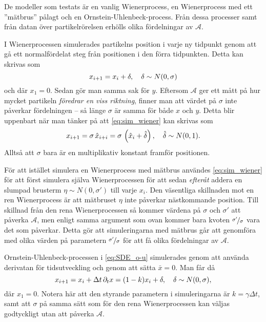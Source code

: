 
De modeller som testats är en vanlig Wienerprocess, en Wienerprocess med ett ''mätbrus'' pålagt och en Ornstein-Uhlenbeck-process. Från dessa processer samt från datan över partikelrörelsen erhölls olika fördelningar av $\mathcal{A}$. 


I Wienerprocessen simulerades partikelns position i varje ny tidpunkt genom att gå ett normalfördelat steg från positionen i den förra tidpunkten. Detta kan skrivas som
\begin{equation}\label{eq:sim_wiener}
x_{i+1} = x_i + \delta 
\qcomma  \delta \sim N(0, \sigma)
\end{equation}
och där $x_1=0$. Sedan gör man samma sak för $y$. Eftersom $\mathcal{A}$ ger ett mått på hur mycket partikeln \emph{föredrar en viss riktning}, finner man att värdet på $\sigma$ inte påverkar fördelningen -- så länge $\sigma$ är samma för både $x$ och $y$. Detta blir uppenbart när man tänker på att \eqref{eq:sim_wiener} kan skrivas som 
\begin{equation}
x_{i+1} =\sigma\,\hat{x}_{i+i} = \sigma\,\left( \hat{x}_i + \hat{\delta} \right) 
\qcomma  \hat{\delta} \sim N(0, 1).
\end{equation}
Alltså att $\sigma$ bara är en multiplikativ konstant framför positionen.

För att istället simulera en Wienerprocess med mätbrus användes \eqref{eq:sim_wiener} för att först simulera själva Wienerprocessen för att sedan \emph{efteråt} addera en slumpad brusterm $\eta \sim N(0, \sigma')$ till varje $x_i$. Den väsentliga skillnaden mot en ren Wienerprocess är att mätbruset $\eta$ inte påverkar nästkommande position. Till skillnad från den rena Wienerprocessen så kommer värdena på $\sigma$ och $\sigma'$ att påverka $\mathcal{A}$, men enligt samma argument som ovan kommer bara kvoten $\nicefrac{\sigma'}{\sigma}$ vara det som påverkar. Detta gör att simuleringarna med mätbrus går att genomföra med olika värden på parametern $\nicefrac{\sigma'}{\sigma}$ för att få olika fördelningar av $\mathcal{A}$. 

Ornstein-Uhlenbeck-processen i \eqref{eq:SDE_o-u} simulerades genom att använda derivatan för tidsutveckling och genom att sätta $\bar{x}=0$. Man får då
\begin{equation}
x_{i+1} = x_i + \Delta{t}\,\pd_{t}x  = (1-k) x_i +  \delta 
\qcomma  \delta \sim N(0, \sigma),
\end{equation}
där $x_1=0$. Notera här att den styrande parametern i simuleringarna är $k=\gamma\Delta{t}$, samt att $\sigma$ på samma sätt som för den rena Wienerprocessen kan väljas godtyckligt utan att påverka $\mathcal{A}$. 

